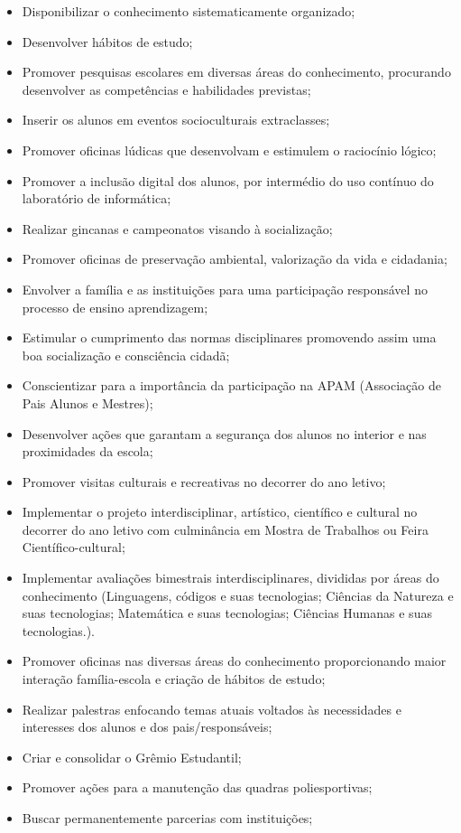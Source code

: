 \begin{itemize}
\item Disponibilizar o conhecimento sistematicamente organizado;
\item Desenvolver hábitos de estudo;
\item Promover pesquisas escolares em diversas áreas do conhecimento, procurando desenvolver as competências e habilidades previstas;
\item Inserir os alunos em eventos socioculturais extraclasses;
\item Promover oficinas lúdicas que desenvolvam e estimulem o raciocínio lógico;
\item Promover a inclusão digital dos alunos, por intermédio do uso contínuo do laboratório de informática;
\item Realizar gincanas e campeonatos visando à socialização;
\item Promover oficinas de preservação ambiental, valorização da vida e cidadania;
\item Envolver a família e as instituições para uma participação responsável no processo de ensino aprendizagem;
\item Estimular o cumprimento das normas disciplinares promovendo assim uma boa socialização e consciência cidadã;
\item Conscientizar para a importância da participação na APAM (Associação de Pais Alunos e Mestres);
\item Desenvolver ações que garantam a segurança dos alunos no interior e nas proximidades da escola;
\item Promover visitas culturais e recreativas no decorrer do ano letivo;
\item Implementar o projeto interdisciplinar, artístico, científico e cultural no decorrer do ano letivo com culminância em Mostra de Trabalhos ou Feira Científico-cultural;
\item Implementar avaliações bimestrais interdisciplinares, divididas por áreas do conhecimento (Linguagens, códigos e suas tecnologias; Ciências da Natureza e suas tecnologias; Matemática e suas tecnologias; Ciências Humanas e suas tecnologias.). 
\item Promover oficinas nas diversas áreas do conhecimento proporcionando maior interação família-escola e criação de hábitos de estudo;
\item Realizar palestras enfocando temas atuais voltados às necessidades e interesses dos alunos e dos pais/responsáveis;
\item Criar e consolidar o Grêmio Estudantil;
\item Promover ações para a manutenção das quadras poliesportivas;
\item Buscar permanentemente parcerias com instituições;
\end{itemize}

